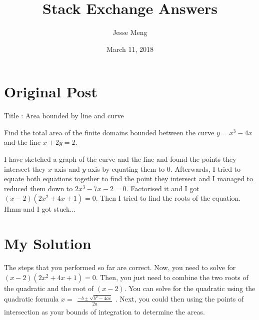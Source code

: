 \documentclass{article}
\title{Stack Exchange Answers}
\author{Jesse Meng }
\date{March 11, 2018}
\begin{document}
\maketitle

\section{Original Post}
Title : Area bounded by line and curve

Find the total area of the finite domains bounded between the curve $y=x^3−4x$ and the line $x+2y=2$.

I have sketched a graph of the curve and the line and found the points they intersect they $x$-axis and $y$-axis by equating them to 0. Afterwards, I tried to equate both equations together to find the point they intersect and I managed to reduced them down to $2x^3-7x-2=0$. Factorised it and I got $(x-2)(2x^2+4x+1)=0$. Then I tried to find the roots of the equation. Hmm and I got stuck...
\section{My Solution}
The steps that you performed so far are correct. Now, you need to solve for $(x-2)(2x^2+4x+1)=0$. Then, you just need to combine the two roots of the quadratic and the root of $(x-2)$. You can solve for the quadratic using the quadratic formula $x=\begin{align}\frac{-b\pm\sqrt{b^2-4ac}}{2a}\end{align}$. Next, you could then using the points of intersection as your bounds of integration to determine the areas.
\end{document}

